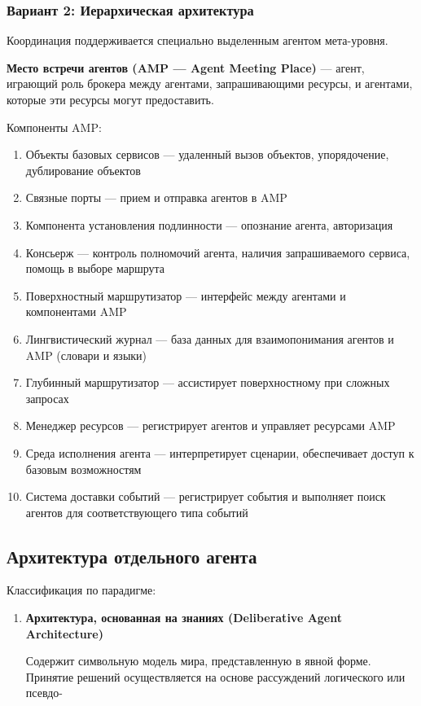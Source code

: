 \subsubsection{Вариант 2: Иерархическая архитектура}

Координация поддерживается специально выделенным агентом мета-уровня.

\textbf{Место встречи агентов (AMP — Agent Meeting Place)} — агент, играющий роль брокера между агентами, запрашивающими ресурсы, и агентами, которые эти ресурсы могут предоставить.

Компоненты AMP:

\begin{enumerate}
  \item Объекты базовых сервисов — удаленный вызов объектов, упорядочение, дублирование объектов
  \item Связные порты — прием и отправка агентов в AMP
  \item Компонента установления подлинности — опознание агента, авторизация
  \item Консьерж — контроль полномочий агента, наличия запрашиваемого сервиса, помощь в выборе маршрута
  \item Поверхностный маршрутизатор — интерфейс между агентами и компонентами AMP
  \item Лингвистический журнал — база данных для взаимопонимания агентов и AMP (словари и языки)
  \item Глубинный маршрутизатор — ассистирует поверхностному при сложных запросах
  \item Менеджер ресурсов — регистрирует агентов и управляет ресурсами AMP
  \item Среда исполнения агента — интерпретирует сценарии, обеспечивает доступ к базовым возможностям
  \item Система доставки событий — регистрирует события и выполняет поиск агентов для соответствующего типа событий
\end{enumerate}

\subsection{Архитектура отдельного агента}

Классификация по парадигме:

\begin{enumerate}
  \item \textbf{Архитектура, основанная на знаниях (Deliberative Agent Architecture)}
  
  Содержит символьную модель мира, представленную в явной форме. Принятие решений осуществляется на основе рассуждений логического или псевдо-
\end{enumerate}
